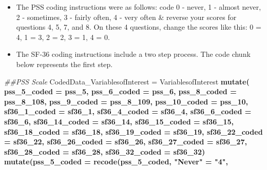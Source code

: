 \documentclass[]{article}
\newenvironment{Shaded}{\begin{snugshade}}{\end{snugshade}}
\newcommand{\CommentTok}[1]{\textcolor[rgb]{0.56,0.35,0.01}{\textit{#1}}}
\newcommand{\DataTypeTok}[1]{\textcolor[rgb]{0.13,0.29,0.53}{#1}}
\newcommand{\DecValTok}[1]{\textcolor[rgb]{0.00,0.00,0.81}{#1}}
\newcommand{\KeywordTok}[1]{\textcolor[rgb]{0.13,0.29,0.53}{\textbf{#1}}}
\newcommand{\NormalTok}[1]{#1}
\newcommand{\OperatorTok}[1]{\textcolor[rgb]{0.81,0.36,0.00}{\textbf{#1}}}
\newcommand{\StringTok}[1]{\textcolor[rgb]{0.31,0.60,0.02}{#1}}
\providecommand{\tightlist}{%
  \setlength{\itemsep}{0pt}\setlength{\parskip}{0pt}}
\begin{document}
\begin{itemize}
\tightlist
\item
  The PSS coding instructions were as follows: code 0 - never, 1 -
  almost never, 2 - sometimes, 3 - fairly often, 4 - very often \&
  reverse your scores for questions 4, 5, 7, and 8. On these 4
  questions, change the scores like this: 0 = 4, 1 = 3, 2 = 2, 3 = 1, 4
  = 0.
\item
  The SF-36 coding instructions include a two step process. The code
  chunk below represents the first step.
\end{itemize}

\begin{Shaded}
\begin{Highlighting}[]
\CommentTok{##PSS Scale}
\NormalTok{CodedData_VariablesofInterest =}
\StringTok{  }\NormalTok{VariablesofInterest }\OperatorTok{%>%}\StringTok{ }
\StringTok{  }\KeywordTok{mutate}\NormalTok{(}
    \DataTypeTok{pss_5_coded =}\NormalTok{ pss_}\DecValTok{5}\NormalTok{,}
    \DataTypeTok{pss_6_coded =}\NormalTok{ pss_}\DecValTok{6}\NormalTok{,}
    \DataTypeTok{pss_8_coded =}\NormalTok{ pss_}\DecValTok{8}\NormalTok{_}\DecValTok{108}\NormalTok{,}
    \DataTypeTok{pss_9_coded =}\NormalTok{ pss_}\DecValTok{8}\NormalTok{_}\DecValTok{109}\NormalTok{,}
    \DataTypeTok{pss_10_coded =}\NormalTok{ pss_}\DecValTok{10}\NormalTok{, }
    \DataTypeTok{sf36_1_coded =}\NormalTok{ sf36_}\DecValTok{1}\NormalTok{,}
    \DataTypeTok{sf36_4_coded =}\NormalTok{ sf36_}\DecValTok{4}\NormalTok{,  }
    \DataTypeTok{sf36_6_coded =}\NormalTok{ sf36_}\DecValTok{6}\NormalTok{,}
    \DataTypeTok{sf36_14_coded =}\NormalTok{ sf36_}\DecValTok{14}\NormalTok{,  }
    \DataTypeTok{sf36_15_coded =}\NormalTok{ sf36_}\DecValTok{15}\NormalTok{,  }
    \DataTypeTok{sf36_18_coded =}\NormalTok{ sf36_}\DecValTok{18}\NormalTok{,}
    \DataTypeTok{sf36_19_coded =}\NormalTok{ sf36_}\DecValTok{19}\NormalTok{,}
    \DataTypeTok{sf36_22_coded =}\NormalTok{ sf36_}\DecValTok{22}\NormalTok{,}
    \DataTypeTok{sf36_26_coded =}\NormalTok{ sf36_}\DecValTok{26}\NormalTok{,}
    \DataTypeTok{sf36_27_coded =}\NormalTok{ sf36_}\DecValTok{27}\NormalTok{,}
    \DataTypeTok{sf36_28_coded =}\NormalTok{ sf36_}\DecValTok{28}\NormalTok{,}
    \DataTypeTok{sf36_32_coded =}\NormalTok{ sf36_}\DecValTok{32}\NormalTok{) }\OperatorTok{%>%}\StringTok{ }
\StringTok{    }
\StringTok{  }\KeywordTok{mutate}\NormalTok{(}\DataTypeTok{pss_5_coded =} \KeywordTok{recode}\NormalTok{(pss_}\DecValTok{5}\NormalTok{_coded, }
                        \StringTok{"Never"}\NormalTok{ =}\StringTok{ "4"}\NormalTok{,}
}}
\end{Highlighting}
\end{Shaded}
\end{document}
